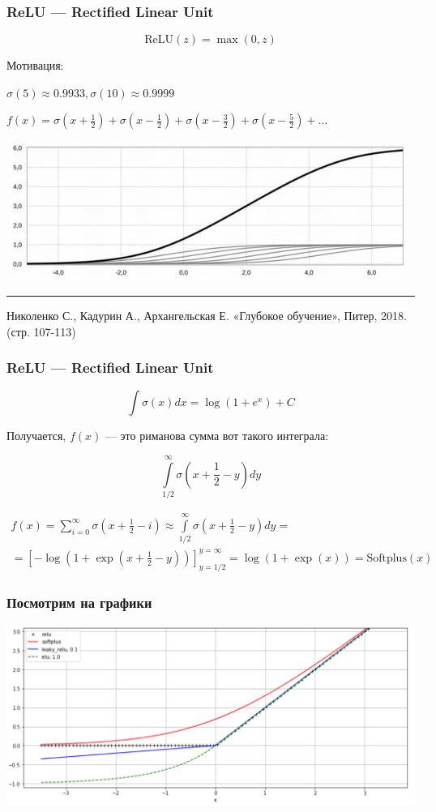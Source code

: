 \documentclass[fullscreen=true, bookmarks=true, hyperref={pdfencoding=unicode}]{beamer}
\begin{document}
\begin{frame}
  \frametitle{ReLU — Rectified Linear Unit}
  $$\text{ReLU}(z) = \max(0, z)$$

  Мотивация:

  $\sigma(5) \approx 0.9933, \sigma(10) \approx 0.9999$

  $f(x) = \sigma(x + \frac12) + \sigma(x - \frac12) + \sigma(x - \frac32) + \sigma(x - \frac52) + \dots$

  \begin{center}
    \includegraphics[keepaspectratio,
                     width=0.7\paperwidth]{from_nikolenko.jpg}
  \end{center}

  \noindent\rule{8cm}{0.4pt}

  Николенко С., Кадурин А., Архангельская Е. «Глубокое обучение», Питер, 2018. (стр. 107-113)
\end{frame}


\begin{frame}
  \frametitle{ReLU — Rectified Linear Unit}
  $$\int \sigma(x) dx = \log(1 + e^x) + C$$

  Получается, $f(x)$ — это риманова сумма вот такого интеграла:

  $$\int\limits_{1/2}^\infty \sigma(x + \frac12 - y) dy $$

  \begin{multline*}
    f(x) = \sum\limits_{i=0}^\infty \sigma(x + \frac12 - i) \approx \int \limits_{1/2}^\infty \sigma(x + \frac12 - y) dy = \\
    = [-\log(1 + \exp(x+\frac12 - y))]_{y=1/2}^{y=\infty} = \log(1 + \exp(x)) = \text{Softplus}(x)
  \end{multline*}
\end{frame}


\begin{frame}
  \frametitle{Посмотрим на графики}
  \begin{center}
    \includegraphics[keepaspectratio,
                     width=0.7\paperwidth]{relu_softplus.png}
  \end{center}
\end{frame}
\end{document}

